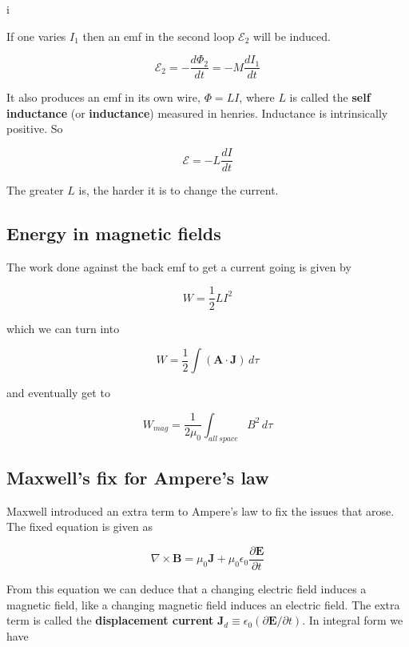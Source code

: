 i\documentclass[a4paper]{article}
\begin{document}
If one varies $I_1$ then an emf in the second loop $\mathcal{E}_2$ will be induced.

\begin{equation}
    \mathcal{E}_2=-\frac{d\Phi_2}{dt}=-M\frac{dI_1}{dt}
\end{equation}

It also produces an emf in its own wire, $\Phi=LI$, where $L$ is called the \textbf{self inductance} (or \textbf{inductance}) measured in henries. Inductance is intrinsically positive. So

\begin{equation}
    \mathcal{E}=-L\frac{dI}{dt}
\end{equation}

The greater $L$ is, the harder it is to change the current.

\subsection{Energy in magnetic fields}

The work done against the back emf to get a current going is given by

\begin{equation}
    W=\frac{1}{2}LI^2
\end{equation}

which we can turn into

\begin{equation}
    W=\frac{1}{2}\int (\bm{A}\cdot\bm{J})\,d\tau
\end{equation}

and eventually get to

\begin{equation}
    W_{mag}=\frac{1}{2\mu_0}\int_{all\ space}B^2\,d\tau
\end{equation}

\subsection{Maxwell's fix for Ampere's law}

Maxwell introduced an extra term to Ampere's law to fix the issues that arose. The fixed equation is given as

\begin{equation}
    \nabla\times\bm{B}=\mu_0\bm{J}+\mu_0\epsilon_0\frac{\partial\bm{E}}{\partial t}
\end{equation}

From this equation we can deduce that a changing electric field induces a magnetic field, like a changing magnetic field induces an electric field. The extra term is called the \textbf{displacement current} $\bm{J}_d\equiv \epsilon_0(\partial\bm{E}/\partial t)$. In integral form we have
\end{document}
